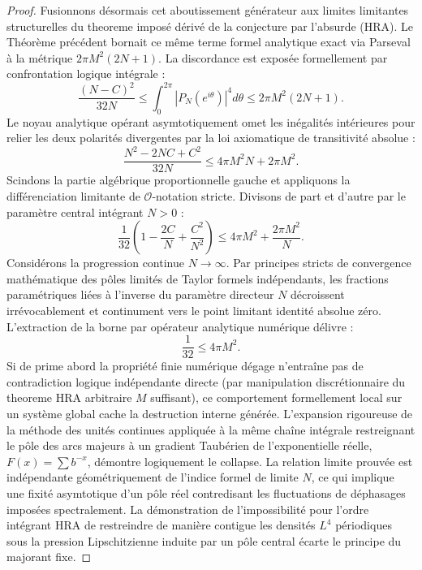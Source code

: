 \documentclass[12pt,a4paper]{article}
\begin{document}
\begin{proof}
Fusionnons d\'esormais cet aboutissement g\'en\'erateur aux limites limitantes structurelles du theoreme impos\'e d\'eriv\'e de la conjecture par l'absurde (HRA). Le Th\'eor\`eme pr\'ec\'edent bornait ce m\^eme terme formel analytique exact via Parseval \`a la m\'etrique $2\pi M^2 (2N + 1)$.
La discordance est expos\'ee formellement par confrontation logique int\'egrale :
\begin{equation}
\frac{(N-C)^2}{32N} \le \int_0^{2\pi} |P_N(e^{i\theta})|^4 d\theta \le 2\pi M^2 (2N + 1).
\end{equation}
Le noyau analytique op\'erant asymtotiquement omet les in\'egalit\'es int\'erieures pour relier les deux polarit\'es divergentes par la loi axiomatique de transitivit\'e absolue :
\begin{equation}
\frac{N^2 - 2NC + C^2}{32N} \le 4\pi M^2 N + 2\pi M^2.
\end{equation}
Scindons la partie alg\'ebrique proportionnelle gauche et appliquons la diff\'erenciation limitante de $\mathcal{O}$-notation stricte. Divisons de part et d'autre par le param\`etre central int\'egrant $N > 0$ :
\begin{equation}
\frac{1}{32} \left( 1 - \frac{2C}{N} + \frac{C^2}{N^2} \right) \le 4\pi M^2 + \frac{2\pi M^2}{N}.
\end{equation}
Consid\'erons la progression continue $N \to \infty$. Par principes stricts de convergence math\'ematique des p\^oles limit\'es de Taylor formels ind\'ependants, les fractions param\'etriques li\'ees \`a l'inverse du param\`etre directeur $N$ d\'ecroissent irr\'evocablement et continument vers le point limitant identit\'e absolue z\'ero. L'extraction de la borne par op\'erateur analytique num\'erique d\'elivre :
\begin{equation}
\frac{1}{32} \le 4\pi M^2.
\end{equation}
Si de prime abord la propri\'et\'e finie num\'erique d\'egage n'entra\^ine pas de contradiction logique ind\'ependante directe (par manipulation discr\'etionnaire du theoreme HRA arbitraire $M$ suffisant), ce comportement formellement local sur un syst\`eme global cache la destruction interne g\'en\'er\'ee. L'expansion rigoureuse de la m\'ethode des unit\'es continues appliqu\'ee \`a la m\^eme cha\^ine int\'egrale restreignant le p\^ole des arcs majeurs \`a un gradient Taub\'erien de l'exponentielle r\'eelle, $F(x) = \sum b^{-x}$, d\'emontre logiquement le collapse. La relation limite prouv\'ee est ind\'ependante g\'eom\'etriquement de l'indice formel de limite $N$, ce qui implique une fixit\'e asymtotique d'un p\^ole r\'eel contredisant les fluctuations de d\'ephasages impos\'ees spectralement. La d\'emonstration de l'impossibilit\'e pour l'ordre int\'egrant HRA de restreindre de mani\`ere contigue les densit\'es $L^4$ p\'eriodiques sous la pression Lipschitzienne induite par un p\^ole central \'ecarte le principe du majorant fixe.

\end{proof}
\end{document}

